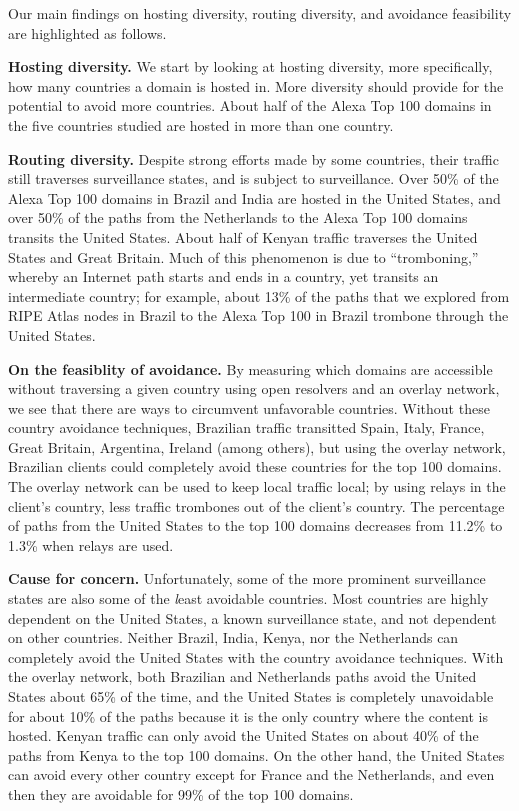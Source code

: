 Our main findings on hosting diversity, routing diversity, and avoidance 
feasibility are highlighted as follows.

{\bf Hosting diversity.} We start by looking at hosting diversity, more specifically, how many
countries a domain is hosted in.  More diversity should provide for the
potential to avoid more countries.  About half of the
Alexa Top 100 domains in the five countries studied are hosted in more
than one country. 

{\bf Routing diversity.} Despite strong efforts made by some countries,
their traffic still traverses surveillance states, and is
subject to surveillance.  Over 50\% of the Alexa Top 100 domains in
Brazil and India are hosted in the United States, and over 50\% of the
paths from the Netherlands to the Alexa Top 100 domains transits the
United States.  About half of Kenyan traffic traverses the United States
and Great Britain.  Much of this phenomenon is
due to ``tromboning,'' whereby an Internet path starts and ends in a
country, yet transits an intermediate country; for example, about 13\%
of the paths that we explored from RIPE Atlas nodes in Brazil to the
Alexa Top 100 in Brazil trombone through the United States. 

{\bf On the feasiblity of avoidance.} By measuring which domains are accessible without traversing a given
country using open resolvers and an overlay network, we see that
there are ways to circumvent unfavorable countries.  Without these
country avoidance techniques, Brazilian traffic transitted Spain, Italy,
France, Great Britain, Argentina, Ireland (among others), but using the
overlay network, Brazilian clients could completely avoid these
countries for the top 100 domains.  The overlay network can be used to
keep local traffic local; by using relays in the client's country, less
traffic trombones out of the client's country.  The percentage of paths
from the United States to the top 100 domains decreases from 11.2\% to 1.3\% when
relays are used.   

{\bf Cause for concern.} Unfortunately, some of the more prominent surveillance states are also
some of the {\textit least avoidable} countries.  Most countries are
highly dependent on the United States, a known surveillance state, and
not dependent on other countries.  Neither Brazil, India, Kenya, nor the
Netherlands can completely avoid the United States with the country
avoidance techniques.  With the overlay network, both Brazilian and
Netherlands paths avoid the United States about 65\% of the time, and
the United States is completely unavoidable for about 10\% of the paths
because it is the only country where the content is hosted.  Kenyan traffic can
only avoid the United States on about 40\% of the paths from Kenya to
the top 100 domains.  On the other hand, the United States can avoid
every other country except for France and the Netherlands, and even then
they are avoidable for 99\% of the top 100 domains. 

